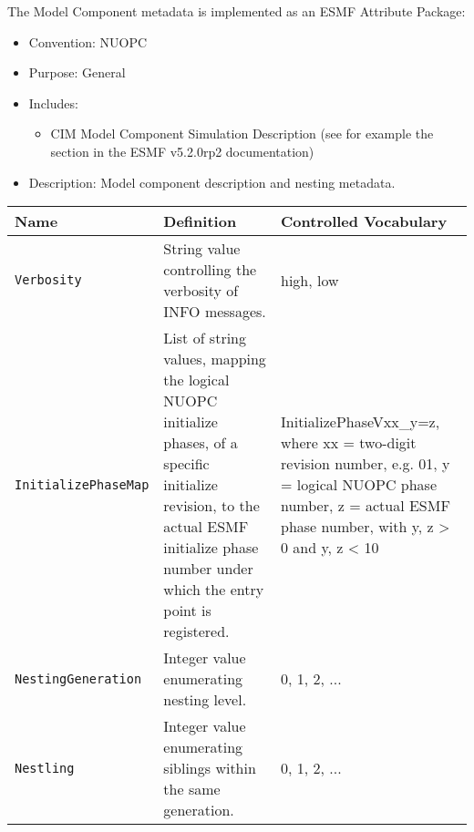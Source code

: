 The Model Component metadata is implemented as an ESMF Attribute Package:

\begin{itemize}
    \item Convention: NUOPC
    \item Purpose: General
    \item Includes:
    \begin{itemize}
      \item CIM Model Component Simulation Description (see for example the  section in the ESMF v5.2.0rp2 documentation)
    \end{itemize} 
    \item Description: Model component description and nesting metadata. 
\end{itemize}

\begin{tabular}{|p{5cm}|p{5cm}|p{35mm}|}
     \hline\hline
     {\bf Name} & {\bf Definition} & {\bf Controlled Vocabulary}\\
     \hline\hline
     {\tt Verbosity} & String value controlling the verbosity of INFO messages.& high, low\\
     {\tt InitializePhaseMap} & List of string values, mapping the logical NUOPC initialize phases, of a specific initialize revision, to the actual ESMF initialize phase number under which the entry point is registered.& InitializePhaseVxx\_y=z, where xx = two-digit revision number, e.g. 01, y = logical NUOPC phase number, z = actual ESMF phase number, with y, z > 0 and y, z < 10 \\
     {\tt NestingGeneration} & Integer value enumerating nesting level.& 0, 1, 2, ...\\
     {\tt Nestling} & Integer value enumerating siblings within the same generation.& 0, 1, 2, ...\\
     \hline\hline
\end{tabular}
